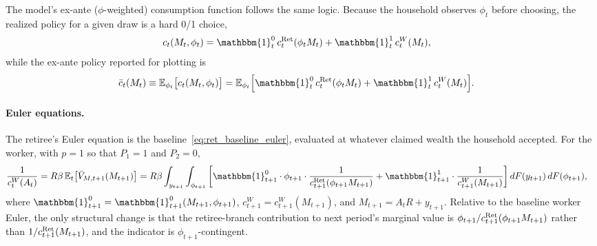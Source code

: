 The model's ex-ante ($\phi$-weighted) consumption function follows the same logic. Because the household observes $\phi_t$ before choosing, the realized policy for a given draw is a hard 0/1 choice,
\begin{align}
	c_t(M_t,\phi_t)
	&= \mathbbm{1}_t^{0}\,c_t^{\Ret}(\phi_t M_t)
	+\mathbbm{1}_t^{1}\,c_t^{W}(M_t),
\end{align}
while the ex-ante policy reported for plotting is
\begin{align}
	\bar c_t(M_t)
	&\equiv \mathbb{E}_{\phi_t}\big[c_t(M_t,\phi_t)\big]
	= \mathbb{E}_{\phi_t}\Big[
		\mathbbm{1}_t^{0}\,c_t^{\Ret}(\phi_t M_t)
		+\mathbbm{1}_t^{1}\,c_t^{W}(M_t)
	\Big].
	\label{eq:ret_price_barc}
\end{align}

\paragraph{Euler equations.}
The retiree's Euler equation is the baseline~\eqref{eq:ret_baseline_euler}, evaluated at whatever claimed wealth the household accepted. For the worker, with $p=1$ so that $P_1=1$ and $P_2=0$,
\begin{align}
	\frac{1}{c_t^{W}(A_t)}
	&= R\beta\,\mathbb{E}_t\big[\bar V_{M,t+1}(M_{t+1})\big]
	= R\beta\int_{y_{t+1}}\int_{\phi_{t+1}}
	\left[
		\mathbbm{1}_{t+1}^{0}\cdot\phi_{t+1}\cdot\frac{1}{c_{t+1}^{\Ret}(\phi_{t+1} M_{t+1})}
		+\mathbbm{1}_{t+1}^{1}\cdot\frac{1}{c_{t+1}^{W}(M_{t+1})}
	\right]
	dF(y_{t+1})\,dF(\phi_{t+1}),
	\label{eq:ret_price_euler_W}
\end{align}
where $\mathbbm{1}_{t+1}^{0}=\mathbbm{1}_{t+1}^{0}(M_{t+1},\phi_{t+1})$, $c_{t+1}^{W}=c_{t+1}^{W}(M_{t+1})$, and $M_{t+1}=A_t R+y_{t+1}$. Relative to the baseline worker Euler, the only structural change is that the retiree-branch contribution to next period's marginal value is $\phi_{t+1}/c_{t+1}^{\mathrm{Ret}}(\phi_{t+1} M_{t+1})$ rather than $1/c_{t+1}^{\mathrm{Ret}}(M_{t+1})$, and the indicator is $\phi_{t+1}$-contingent.


